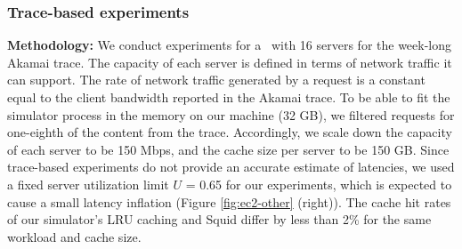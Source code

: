 
\subsubsection{Trace-based experiments}
\label{sec:simulation}

\textbf{Methodology:} We conduct experiments for a \cdc\ with 16 servers for the week-long Akamai trace. The capacity of each server is defined in terms of network traffic it can support. The rate of network traffic generated by a request is a constant equal to the client bandwidth reported in the Akamai trace. To be able to fit the simulator process in the memory on our machine (32 GB), we filtered requests for one-eighth of the content from the trace. Accordingly, we scale down  the capacity of each server to be 150 Mbps, and the cache size per server to be 150 GB. Since trace-based experiments do not provide an accurate estimate of latencies, we used a fixed server utilization limit $U$ = 0.65 for our experiments, which is expected to cause a small latency inflation (Figure \ref{fig:ec2-other} (right)). 
The cache hit rates of our simulator's LRU caching and Squid differ by less than 2\% for the same workload and cache size. 


